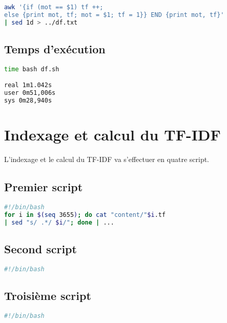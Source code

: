 \documentclass{article}
\begin{document}
\begin{lstlisting}[language=bash,caption={Occurences}]
awk '{if (mot == $1) tf ++; 
else {print mot, tf; mot = $1; tf = 1}} END {print mot, tf}' 
| sed 1d > ../df.txt
\end{lstlisting}

\subsection{Temps d'exécution}

\begin{lstlisting}[language=bash,caption={Temps d'exécution du script df.sh}]
time bash df.sh

real 1m1.042s
user 0m51,006s
sys 0m28,940s

\end{lstlisting}

\section{Indexage et calcul du TF-IDF}

L'indexage et le calcul du TF-IDF va s'effectuer en quatre script. 

\subsection{Premier script}

\begin{lstlisting}[language=bash,caption={Script n1}]
#!/bin/bash
for i in $(seq 3655); do cat "content/"$i.tf 
| sed "s/ .*/ $i/"; done | ...
\end{lstlisting}

\subsection{Second script}

\begin{lstlisting}[language=bash,caption={Script n1}]
#!/bin/bash


\end{lstlisting}

\subsection{Troisième script}

\begin{lstlisting}[language=bash,caption={Script n1}]
#!/bin/bash


\end{lstlisting}
\end{document}
